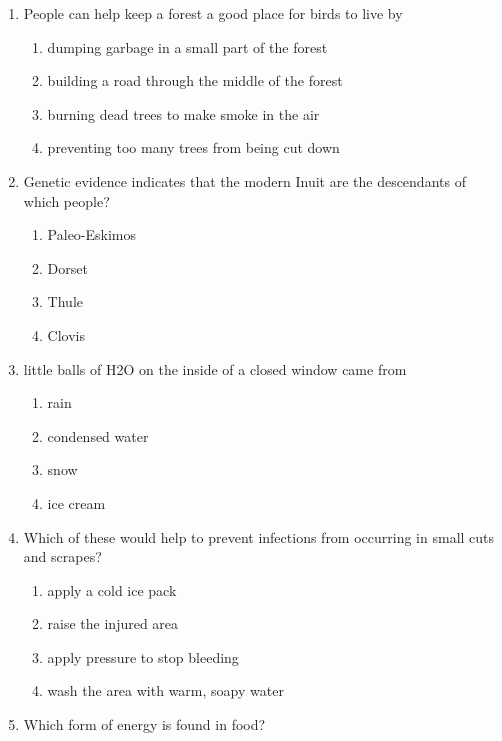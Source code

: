 \documentclass[12pt]{article}
\begin{document}
\begin{enumerate}[label=\arabic*.]
\begin{enumerate}[label=(\alph*)]
    \item the water
    \item the moon
    \item the leaves
    \item the sun
\end{enumerate}
\item People can help keep a forest a good place for birds to live by
\begin{enumerate}[label=(\alph*)]
    \item dumping garbage in a small part of the forest
    \item building a road through the middle of the forest
    \item burning dead trees to make smoke in the air
    \item preventing too many trees from being cut down
\end{enumerate}
\item Genetic evidence indicates that the modern Inuit are the descendants of which people?
\begin{enumerate}[label=(\alph*)]
    \item Paleo-Eskimos
    \item Dorset
    \item Thule
    \item Clovis
\end{enumerate}
\item little balls of H2O on the inside of a closed window came from
\begin{enumerate}[label=(\alph*)]
    \item rain
    \item condensed water
    \item snow
    \item ice cream
\end{enumerate}
\item Which of these would help to prevent infections from occurring in small cuts and scrapes?
\begin{enumerate}[label=(\alph*)]
    \item apply a cold ice pack
    \item raise the injured area
    \item apply pressure to stop bleeding
    \item wash the area with warm, soapy water
\end{enumerate}
\item Which form of energy is found in food?

\end{enumerate}
\end{document}
